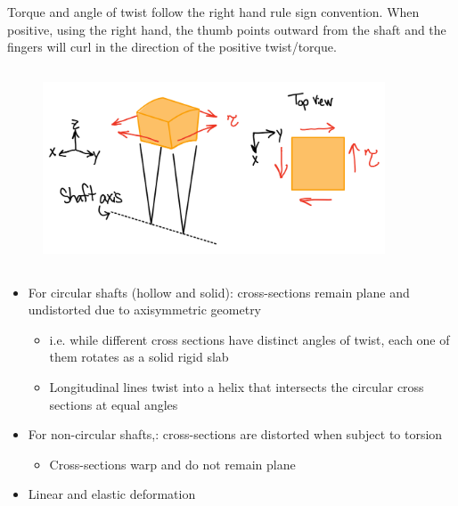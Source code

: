 \noindent Torque and angle of twist follow the right hand rule sign convention. When positive, using the right hand, the thumb points outward from the shaft and the fingers will curl in the direction of the positive twist/torque.



\subsection{}
\begin{figure}[!h]
\centering
\includegraphics[angle=0, width=4in]{Torsion-Figures/Equilibrium.png}
\vspace{-2mm}
\caption{\small {}}
\vspace{-3mm}
\label{Fig:Equilibrium}
\end{figure}

\subsection{}

\begin{itemize}
    \item For circular shafts (hollow and solid): cross-sections remain plane and undistorted due to axisymmetric geometry
    \begin{itemize}
        \item i.e. while different cross sections have distinct angles of twist, each one of them rotates as a solid rigid slab
        \item Longitudinal lines twist into a helix that intersects the circular cross sections at equal angles
    \end{itemize}
    \item For non-circular shafts,: cross-sections are distorted when subject to torsion
    \begin{itemize}
        \item Cross-sections warp and do not remain plane
    \end{itemize}
    \item Linear and elastic deformation
\end{itemize}

